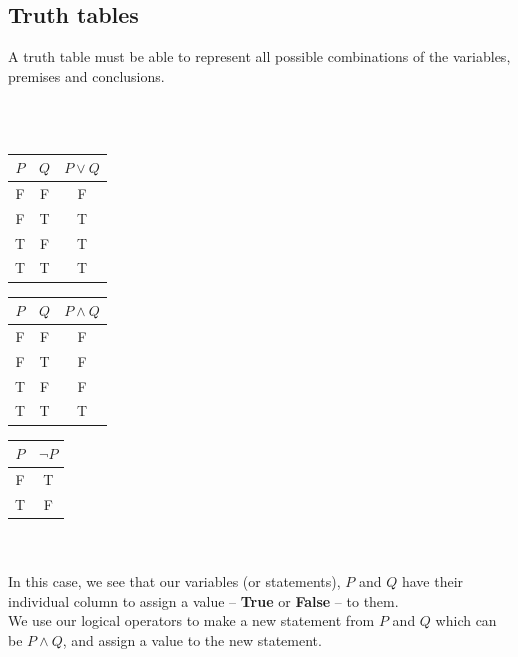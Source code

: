 \documentclass[../setup.tex]{subfiles}
\begin{document}
\subsection{Truth tables}
A truth table must be able to represent all possible combinations of the variables, premises and conclusions.\\
\\

{
\centering
\ \ \ \ \ \ \ \ \ \ \ \ \ \ \ \ \ \ \ \ \ \ \
\begin{minipage}[t]{0.32\textwidth}
	\begin{tabular}[t]{|c|c|c|}
		\hline
		$P$&$Q$&$P\lor Q$ \\
		\hline
		F&F&F \\
		F&T&T \\
		T&F&T \\
		T&T&T \\
		\hline
	\end{tabular}

\end{minipage}
\quad
\begin{minipage}[t]{0.32\textwidth}
	\begin{tabular}[t]{|c|c|c|}
		\hline
		$P$&$Q$&$P\land Q$ \\
		\hline
		F&F&F \\
		F&T&F \\
		T&F&F \\
		T&T&T \\
		\hline
	\end{tabular} 
\end{minipage}
\quad
\begin{minipage}[t]{0.32\textwidth}
	\begin{tabular}[t]{|c|c|}
		\hline
		$P$&$\lnot P$ \\
		\hline
		F&T \\
		T&F \\
		\hline
	\end{tabular}
\end{minipage}
}
\\ 
\\
In this case, we see that our variables (or statements), $P$ and $Q$ have their individual column to assign a value -- \textbf{True} or \textbf{False} -- to them. \\
We use our logical operators to make a new statement from $P$ and $Q$ which can be $P\land Q$, and assign a value to the new statement. \\
\end{document}
